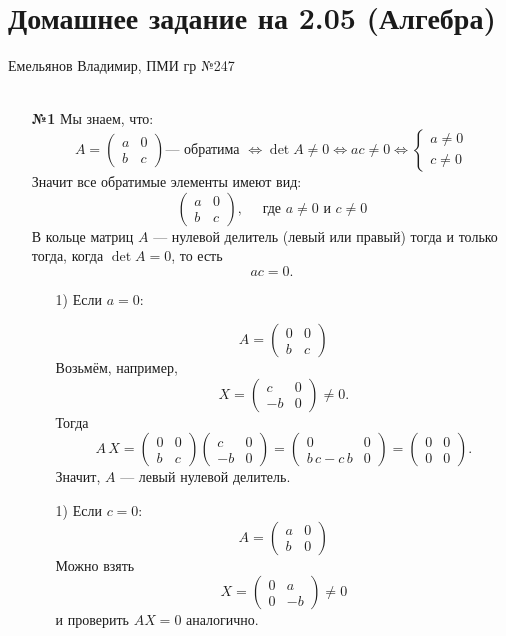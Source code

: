 \documentclass[a4paper]{article}
\newcommand{\case}[1]{\begin{cases} #1 \end{cases}}
\newcommand{\lr}{\Leftrightarrow}
\begin{document}
\section*{Домашнее задание на 2.05 (Алгебра)}
 {\large Емельянов Владимир, ПМИ гр №247}\\\\
\begin{enumerate}
    \item[\textbf{№1}]Мы знаем, что:
    $$A=\begin{pmatrix}a&0\\ b&c\end{pmatrix} \text{--- обратима }\lr \det A \neq 0 \lr ac \neq 0 \lr \case{a \neq 0\\c \neq 0} $$
    Значит все обратимые элементы имеют вид:
    $$\begin{pmatrix}a&0\\ b&c\end{pmatrix}, \quad \text{ где } a\neq 0 \text{ и } c \neq 0$$
    В кольце матриц \(A\) — нулевой делитель (левый или правый) тогда и только тогда, когда \(\det A=0\), то есть  
    \[
    ac = 0.
    \]
    \begin{enumerate}
        \item[1)]Если $a = 0$:
        
        \[A=\begin{pmatrix}0&0\\ b&c\end{pmatrix}\]  
        Возьмём, например,  
        \[
        X=\begin{pmatrix}c&0\\-b&0\end{pmatrix}\neq0.
        \]
        Тогда
        \[
        A\,X
        =\begin{pmatrix}0&0\\ b&c\end{pmatrix}
            \begin{pmatrix}c&0\\-b&0\end{pmatrix}
        =\begin{pmatrix}0&0\\ b\,c - c\,b & 0\end{pmatrix}
        =\begin{pmatrix}0&0\\0&0\end{pmatrix}.
        \]
        Значит, \(A\) — левый нулевой делитель.

        \item[1)]Если $c = 0$:
        \[A=\begin{pmatrix}a&0\\ b&0\end{pmatrix}\]   
        Можно взять  
        \[
        X=\begin{pmatrix}0&a\\0&-b\end{pmatrix}\neq0
        \]
        и проверить \(A X=0\) аналогично.
    \end{enumerate}


\end{enumerate}
\end{document}
